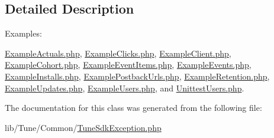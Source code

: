 \subsection{Detailed Description}
\begin{Desc}
\item[Examples\-: ]\par
\hyperlink{ExampleActuals_8php-example}{Example\-Actuals.\-php}, \hyperlink{ExampleClicks_8php-example}{Example\-Clicks.\-php}, \hyperlink{ExampleClient_8php-example}{Example\-Client.\-php}, \hyperlink{ExampleCohort_8php-example}{Example\-Cohort.\-php}, \hyperlink{ExampleEventItems_8php-example}{Example\-Event\-Items.\-php}, \hyperlink{ExampleEvents_8php-example}{Example\-Events.\-php}, \hyperlink{ExampleInstalls_8php-example}{Example\-Installs.\-php}, \hyperlink{ExamplePostbackUrls_8php-example}{Example\-Postback\-Urls.\-php}, \hyperlink{ExampleRetention_8php-example}{Example\-Retention.\-php}, \hyperlink{ExampleUpdates_8php-example}{Example\-Updates.\-php}, \hyperlink{ExampleUsers_8php-example}{Example\-Users.\-php}, and \hyperlink{UnittestUsers_8php-example}{Unittest\-Users.\-php}.\end{Desc}


The documentation for this class was generated from the following file\-:\begin{DoxyCompactItemize}
\item 
lib/\-Tune/\-Common/\hyperlink{TuneSdkException_8php}{Tune\-Sdk\-Exception.\-php}\end{DoxyCompactItemize}
